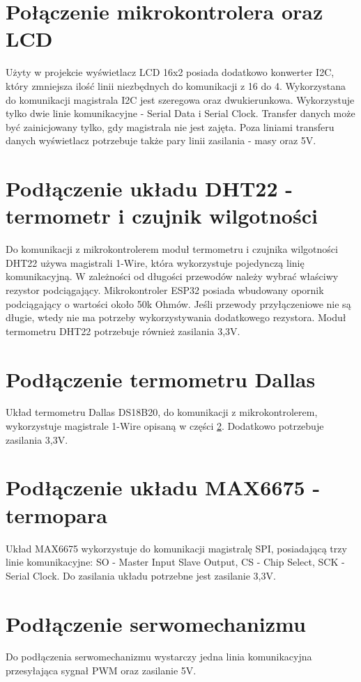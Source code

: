 \documentclass[11pt]{report}
\begin{document}
 \section{Połączenie mikrokontrolera oraz LCD}
 Użyty w projekcie wyświetlacz LCD 16x2 posiada dodatkowo konwerter I2C, który zmniejsza ilość linii niezbędnych do komunikacji z 16 do 4. Wykorzystana do komunikacji magistrala I2C jest szeregowa oraz dwukierunkowa. Wykorzystuje tylko dwie linie komunikacyjne - Serial Data i Serial Clock. Transfer danych może być zainicjowany tylko, gdy magistrala nie jest zajęta. Poza liniami transferu danych wyświetlacz potrzebuje także pary linii zasilania - masy oraz 5V.
  
 \section{Podłączenie układu DHT22 - termometr i czujnik wilgotności}\label{dht}
 Do komunikacji z mikrokontrolerem moduł termometru i czujnika wilgotności DHT22  używa magistrali 1-Wire, która wykorzystuje pojedynczą linię komunikacyjną. W zależności od długości przewodów należy wybrać właściwy rezystor podciągający.  Mikrokontroler ESP32 posiada wbudowany opornik podciągający o wartości około 50k Ohmów. Jeśli przewody przyłączeniowe nie są długie, wtedy nie ma potrzeby wykorzystywania dodatkowego rezystora.
 Moduł termometru DHT22 potrzebuje również zasilania 3,3V.
 
 \section{Podłączenie termometru Dallas}
 Układ termometru Dallas DS18B20, do komunikacji z mikrokontrolerem, wykorzystuje magistrale 1-Wire opisaną w części \ref{dht}. Dodatkowo potrzebuje zasilania 3,3V.
 
 \section{Podłączenie układu MAX6675 - termopara}
 Układ MAX6675 wykorzystuje do komunikacji magistralę SPI, posiadającą trzy linie komunikacyjne: SO - Master Input Slave Output, CS - Chip Select, SCK - Serial Clock. Do zasilania układu potrzebne jest zasilanie 3,3V.
 
 \section{Podłączenie serwomechanizmu}
 Do podłączenia serwomechanizmu wystarczy jedna linia komunikacyjna przesyłająca sygnał PWM oraz zasilanie 5V.
 
\end{document}
